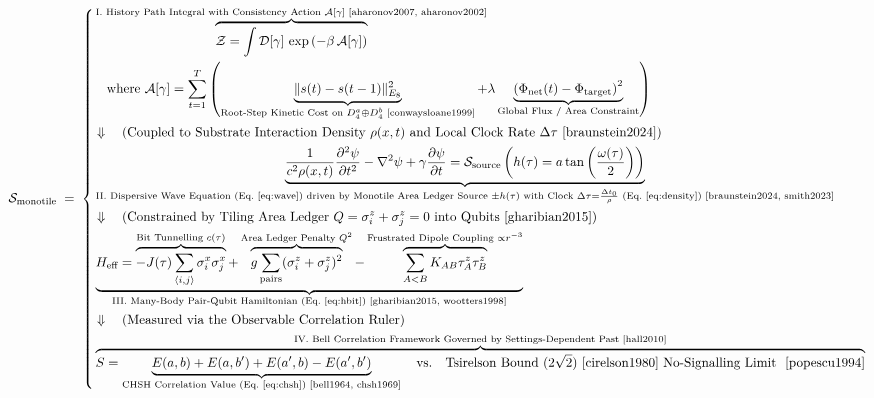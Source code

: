 \documentclass[11pt]{article}
\theoremstyle{definition}
\begin{document}
{\footnotesize
\begin{equation}
\mathcal{S}_{\text{monotile}}
\;=\; \left\{ \begin{aligned} &\overbrace{ \mathcal{Z} = \int
\mathcal{D}[\gamma]\,\exp\left(-\beta\, \mathcal{A}[\gamma]\right)
}^{\text{I. History Path Integral with Consistency Action }
\mathcal{A}[\gamma] \text{ \cite{aharonov2007, aharonov2002}}} \\ &\quad \text{where } \mathcal{A}[\gamma]
= \sum_{t=1}^{T} \left( \underbrace{\|s(t) -
s(t-1)\|_{E_8}^2}_{\text{Root-Step Kinetic Cost on } D_4^a
\oplus D_4^b \text{ \cite{conwaysloane1999}}} + \lambda \underbrace{\left(\Phi_{\text{net}}(t) -
\Phi_{\text{target}}\right)^2}_{\text{Global Flux / Area Constraint}}
\right) \\ &\Downarrow \quad \text{(Coupled to Substrate
Interaction Density } \rho(x,t) \text{ and Local Clock Rate }
\Delta\tau \text{ \cite{braunstein2024})} \\ &\underbrace{
\frac{1}{c^2\rho(x,t)}\frac{\partial^2\psi}{\partial t^2} -
\nabla^2\psi + \gamma\frac{\partial\psi}{\partial t} =
\mathcal{S}_{\text{source}}\left( h(\tau) =
a\tan\left(\frac{\omega(\tau)}{2}\right) \right) }_{\text{II.
Dispersive Wave Equation (Eq.~\ref{eq:wave}) driven by Monotile Area Ledger
Source } \pm h(\tau) \text{ with Clock } \Delta\tau = \frac{\Delta
t_0}{\rho} \text{ (Eq.~\ref{eq:density}) \cite{braunstein2024, smith2023}}} \\ &\Downarrow \quad
\text{(Constrained by Tiling Area Ledger } Q = \sigma_i^z +
\sigma_j^z = 0 \text{ into Qubits \cite{gharibian2015})} \\ &\underbrace{
H_{\text{eff}} = \overbrace{ -J(\tau)\sum_{\langle i,j \rangle}
\sigma_i^x \sigma_j^x }^{\text{Bit Tunnelling } c(\tau)} +
\overbrace{ g\sum_{\text{pairs}} (\sigma_i^z + \sigma_j^z)^2
}^{\text{Area Ledger Penalty } Q^2} - \overbrace{ \sum_{A<B}
K_{AB}\tau_A^z \tau_B^z }^{\text{Frustrated Dipole Coupling } \propto
r^{-3}} }_{\text{III. Many-Body Pair-Qubit Hamiltonian (Eq.~\ref{eq:hbit}) \cite{gharibian2015, wootters1998}}} \\ &\Downarrow \quad \text{(Measured via the Observable
Correlation Ruler)} \\ &\overbrace{ S = \underbrace{E(a,b) +
E(a,b^{\prime}) + E(a^{\prime},b) -
E(a^{\prime},b^{\prime})}_{\text{CHSH Correlation Value (Eq.~\ref{eq:chsh}) \cite{bell1964, chsh1969}}} \quad \text{vs.} \quad \text{Tsirelson Bound } (2\sqrt{2}) \text{ \cite{cirelson1980}}
\text{ No-Signalling Limit } \text{ \cite{popescu1994}} }^{\text{IV. Bell Correlation
Framework Governed by Settings-Dependent Past \cite{hall2010}}}
\end{aligned} \right.
\end{equation}
}
\end{document}
